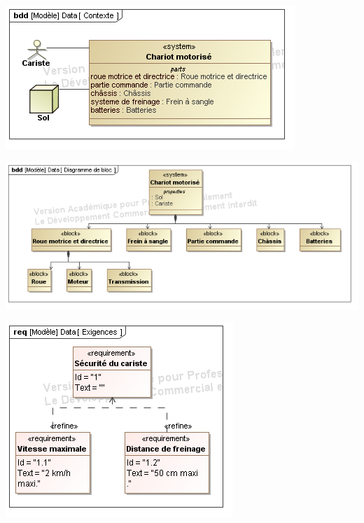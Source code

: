 \documentclass[10pt]{article}
\begin{document}
\begin{minipage}[c]{.3\linewidth}
\begin{center}
\includegraphics[width=\textwidth]{images/Contexte}
\end{center}
\end{minipage} \hfill
\begin{minipage}[c]{.39\linewidth}
\begin{center}
\includegraphics[width=\textwidth]{images/Blocs}
\end{center}
\end{minipage}\hfill
\begin{minipage}[c]{.3\linewidth}
\begin{center}
\includegraphics[width=\textwidth]{images/Exigences}
\end{center}
\end{minipage}
\end{document}
